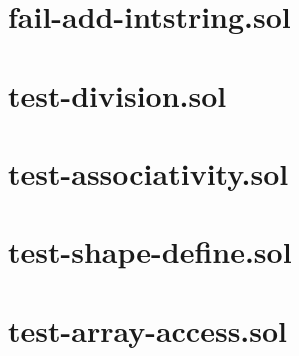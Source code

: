 \section{fail-add-intstring.sol}


\section{test-division.sol}


\section{test-associativity.sol}


\section{test-shape-define.sol}


\section{test-array-access.sol}


